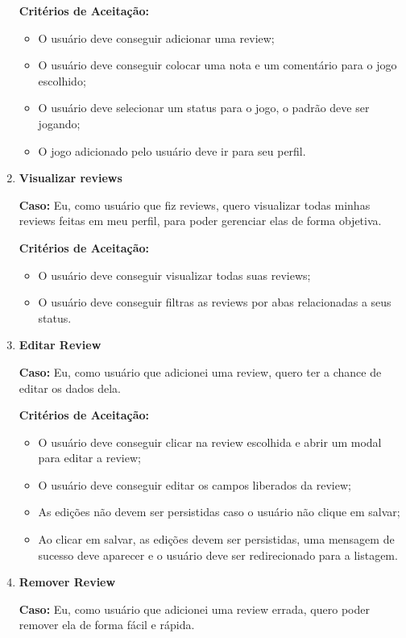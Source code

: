 \begin{enumerate}
  \textbf{Critérios de Aceitação:}
  \begin{itemize}
      \item O usuário deve conseguir adicionar uma review;
      \item O usuário deve conseguir colocar uma nota e um comentário para o jogo escolhido;
      \item O usuário deve selecionar um status para o jogo, o padrão deve ser jogando;
      \item O jogo adicionado pelo usuário deve ir para seu perfil.
  \end{itemize}

  \item \textbf{Visualizar reviews}

  \textbf{Caso:} Eu, como usuário que fiz reviews, quero visualizar todas minhas reviews feitas em meu perfil, para poder gerenciar elas de forma objetiva.

  \textbf{Critérios de Aceitação:}
  \begin{itemize}
      \item O usuário deve conseguir visualizar todas suas reviews;
      \item O usuário deve conseguir filtras as reviews por abas relacionadas a seus status.
  \end{itemize}

  \item \textbf{Editar Review}

  \textbf{Caso:} Eu, como usuário que adicionei uma review, quero ter a chance de editar os dados dela.

  \textbf{Critérios de Aceitação:}
  \begin{itemize}
      \item O usuário deve conseguir clicar na review escolhida e abrir um modal para editar a review;
      \item O usuário deve conseguir editar os campos liberados da review;
      \item As edições não devem ser persistidas caso o usuário não clique em salvar;
      \item Ao clicar em salvar, as edições devem ser persistidas, uma mensagem de sucesso deve aparecer e o usuário deve ser redirecionado para a listagem.
  \end{itemize}

  \item \textbf{Remover Review}

  \textbf{Caso:} Eu, como usuário que adicionei uma review errada, quero poder remover ela de forma fácil e rápida.


\end{enumerate}
